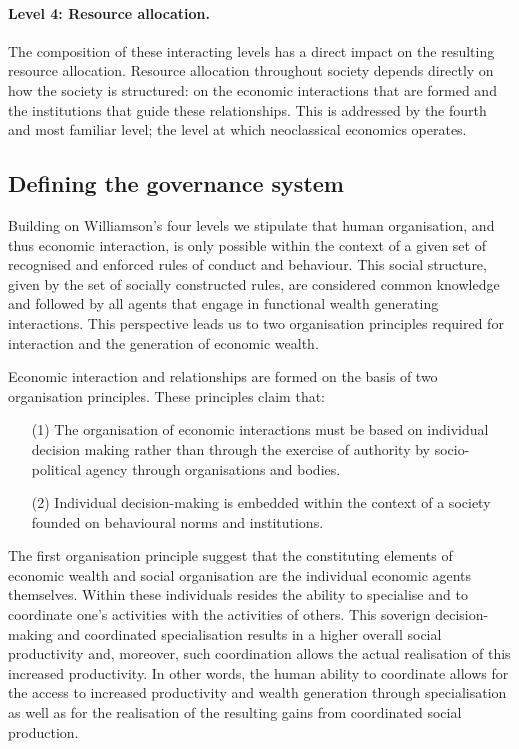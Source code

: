 \paragraph{Level 4: Resource allocation.}

The composition of these interacting levels has a direct impact on the resulting resource allocation. Resource allocation throughout society depends directly on how the society is structured: on the economic interactions that are formed and the institutions that guide these relationships. This is addressed by the fourth and most familiar level; the level at which neoclassical economics operates.

\subsection{Defining the governance system}

Building on Williamson's four levels we stipulate that human organisation, and thus economic interaction, is only possible within the context of a given set of recognised and enforced rules of conduct and behaviour. This social structure, given by the set of socially constructed rules, are considered common knowledge and followed by all agents that engage in functional wealth generating interactions. This perspective leads us to two organisation principles required for interaction and the generation of economic wealth. 
\begin{hypothesis} \label{hyp:organisationPrinciples}
Economic interaction and relationships are formed on the basis of two organisation principles. These principles claim that:
\begin{itemize}
\item[(1)] The organisation of economic interactions must be based on individual decision making rather than through the exercise of authority by socio-political agency through organisations and bodies. 
\item[(2)] Individual decision-making is embedded within the context of a society founded on behavioural norms and institutions.
\end{itemize}
\end{hypothesis}
The first organisation principle suggest that the constituting elements of economic wealth and social organisation are the individual economic agents themselves. Within these individuals resides the ability to specialise and to coordinate one's activities with the activities of others. This soverign decision-making and coordinated specialisation results in a higher overall social productivity and, moreover, such coordination allows the actual realisation of this increased productivity. In other words, the human ability to coordinate allows for the access to increased productivity and wealth generation through specialisation as well as for the realisation of the resulting gains from coordinated social production.

